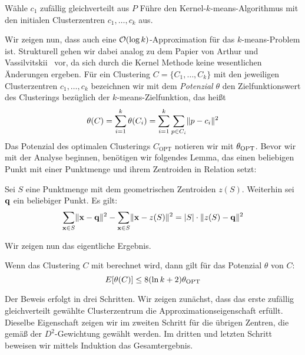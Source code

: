 \begin{algorithm}
\label{algo:kernelkmeanspp}
\caption{\kkmpp}
	\DontPrintSemicolon
	
	\BlankLine
	
	Wähle $c_1$ zufällig gleichverteilt aus $P$\;
	Führe den Kernel-$k$-means-Algorithmus mit den initialen Clusterzentren $c_1, \dots, c_k$ aus.
\end{algorithm}
Wir zeigen nun, dass auch \kkmpp{} eine $\mathcal{O}(\log k)$-Approximation für das $k$-means-Problem ist. Strukturell gehen
wir dabei analog zu dem Papier von Arthur und Vassilvitskii~\cite{ArthurV07} vor, da sich durch die Kernel Methode keine
wesentlichen Änderungen ergeben. Für ein Clustering $C = \{ C_1, \dots, C_k \}$ mit den jeweiligen Clusterzentren
$c_1, \dots, c_k$ bezeichnen wir mit dem \emph{Potenzial} $\theta$ den Zielfunktionswert des Clusterings bezüglich der
$k$-means-Zielfunktion, das heißt
\[ \theta(C) = \sum_{i=1}^k \theta(C_i) = \sum_{i=1}^k \sum_{p \in C_i} \lVert {p} - {c_i} \rVert^2 \]
Das Potenzial des optimalen Clusterings $C_\textrm{OPT}$ notieren wir mit $\theta_{\textrm{OPT}}$. Bevor wir mit der Analyse beginnen,
benötigen wir folgendes Lemma, das einen beliebigen Punkt mit einer Punktmenge und ihrem Zentroiden in Relation setzt:

\begin{lemma}
\label{lemma:point-centroid}
	Sei $S$ eine Punktmenge mit dem geometrischen Zentroiden $z(S)$. Weiterhin sei $\mathbf{q}$ ein beliebiger Punkt. Es gilt:
	\[ \sum_{\mathbf{x} \in S} \lVert {\ensuremath{\mathbf{x}}} - {\mathbf{q}} \rVert^2 - \sum_{\mathbf{x} \in S} \lVert {\ensuremath{\mathbf{x}}} - {z(S)} \rVert^2
		= \left|S\right| \cdot \lVert {z(S)} - {\mathbf{q}} \rVert^2 \]
\end{lemma}
Wir zeigen nun das eigentliche Ergebnis.

\begin{satz}
\label{thm:kkmpp-ologk-approx}
	Wenn das Clustering $C$ mit \kkmpp{} berechnet wird, dann gilt für das Potenzial $\theta$ von $C$:
	\[ E[\theta(C)] \leq 8 (\ln{k} + 2) \theta_{\textrm{OPT}} \]
\end{satz}
Der Beweis erfolgt in drei Schritten. Wir zeigen zunächst, dass das erste zufällig gleichverteilt gewählte Clusterzentrum
die Approximationseigenschaft erfüllt. Dieselbe Eigenschaft zeigen wir im zweiten Schritt für die übrigen Zentren, die gemäß
der $D^2$-Gewichtung gewählt werden. Im dritten und letzten Schritt beweisen wir mittels Induktion das Gesamtergebnis.

